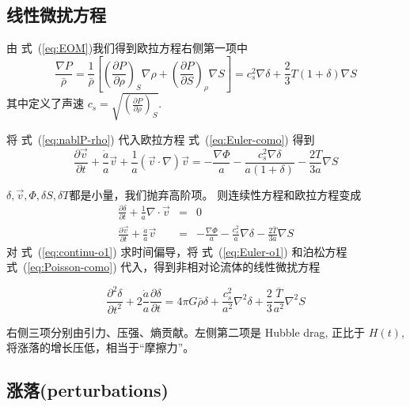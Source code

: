 \documentclass[12pt]{ctexart}
\newcommand{\refeq}[1]{式~(\ref{#1})}
\begin{document}
\subsection{线性微扰方程}
由 \refeq{eq:EOM}我们得到欧拉方程右侧第一项中
\begin{equation} \label{eq:nablP-rho}
    \frac{\nabla P}{\bar{\rho}} = \frac{1}{\bar{\rho}} \left[\left(\frac{\partial P}{\partial \rho}\right)_S \nabla \rho + \left(\frac{\partial P}{\partial S}\right)_\rho \nabla S\right] = c_s^2 \nabla \delta + \frac{2}{3} T\left(1+\delta \right) \nabla S
\end{equation}
其中定义了声速 $c_s=\sqrt{\left(\frac{\partial P}{\partial \rho}\right)_S}$.

将 \refeq{eq:nablP-rho} 代入欧拉方程 \refeq{eq:Euler-como} 得到 
\begin{equation} \label{eq:sEuler}
    \frac{\partial \vec{v}}{\partial t}+\frac{\dot{a}}{a} \vec{v}+\frac{1}{a}(\vec{v} \cdot \nabla) \vec{v}=-\frac{\nabla \Phi}{a} - \frac{c_s^2 \nabla \delta}{a \left(1+\delta \right) } - \frac{2T}{3a}\nabla S
\end{equation}


$\delta, \vec{v}, \Phi, \delta S, \delta T$都是小量，我们抛弃高阶项。
则连续性方程和欧拉方程变成
\begin{eqnarray}
    \frac{\partial \delta }{\partial t} +\frac{1}{a} \nabla \cdot \vec{v} &=& 0  \label{eq:continu-o1} \\ 
    \frac{\partial \vec{v}}{\partial t} + \frac{\dot{a}}{a}\vec{v} &=& -\frac{\nabla \Phi}{a} - \frac{c_s^2}{a}\nabla \delta - \frac{2\bar{T}}{3 a}\nabla S \label{eq:Euler-o1}
\end{eqnarray}
对 \refeq{eq:continu-o1} 求时间偏导，将 \refeq{eq:Euler-o1} 和泊松方程 \refeq{eq:Poisson-como} 代入，得到非相对论流体的线性微扰方程
\begin{shaded}
    \begin{equation} \label{eq:linear_pertur}
        \frac{\partial^{2} \delta}{\partial t^{2}}+2 \frac{\dot{a}}{a} \frac{\partial \delta}{\partial t}=4 \pi G \bar{\rho} \delta+\frac{c_{s}^{2}}{a^{2}} \nabla^{2} \delta+\frac{2}{3} \frac{\bar{T}}{a^{2}} \nabla^{2} S
    \end{equation}  
\end{shaded}
右侧三项分别由引力、压强、熵贡献。左侧第二项是 Hubble drag, 正比于 $H(t)$, 将涨落的增长压低，相当于“摩擦力”。

\subsection{涨落(perturbations)}
\end{document}
